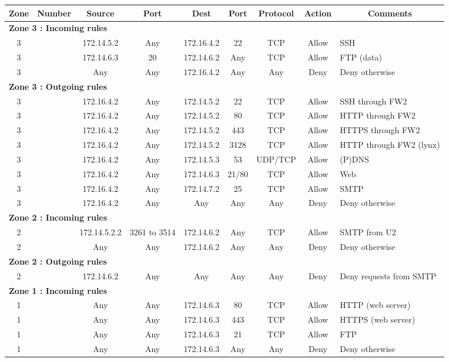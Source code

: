 \documentclass[a4paper,titlepage]{article}
\begin{document}
\begin{table}[h]
	\centering
	\small
	\begin{tabular}{c|c|cc|cc|ccl}
		Zone & Number & Source & Port & Dest & Port & Protocol & Action & \multicolumn{1}{c}{Comments}\\
		\hline
		\multicolumn{9}{l}{\textbf{Zone 3 : Incoming rules}}\\
		3 &  & 172.14.5.2 & Any & 172.16.4.2 & 22 & TCP & Allow & SSH\\
		3 &  & 172.14.6.3 & 20 & 172.14.6.2 & Any & TCP & Allow & FTP (data)\\
		3 &  & Any & Any & 172.16.4.2 & Any & Any & Deny & Deny otherwise\\

		\hline
		\multicolumn{9}{l}{\textbf{Zone 3 : Outgoing rules}}\\
		3 &  & 172.16.4.2 & Any & 172.14.5.2 & 22 & TCP & Allow & SSH through FW2\\
		3 &  & 172.16.4.2 & Any & 172.14.5.2 & 80 & TCP & Allow & HTTP through FW2\\
		3 &  & 172.16.4.2 & Any & 172.14.5.2 & 443 & TCP & Allow & HTTPS through FW2\\
		3 &  & 172.16.4.2 & Any & 172.14.5.2 & 3128 & TCP & Allow & HTTP through FW2 (lynx) \\
		3 &  & 172.16.4.2 & Any & 172.14.5.3 & 53 & UDP/TCP & Allow & (P)DNS\\
		3 &  & 172.16.4.2 & Any & 172.14.6.3 & 21/80 & TCP & Allow & Web\\
		3 &  & 172.16.4.2 & Any & 172.14.7.2 & 25 & TCP & Allow & SMTP\\
		3 &  & 172.16.4.2 & Any & Any & Any & Any & Deny & Deny otherwise\\

		\hline
		\multicolumn{9}{l}{\textbf{Zone 2 : Incoming rules}}\\
		2 &  & 172.14.5.2.2 & 3261 to 3514 & 172.14.6.2 & Any & TCP & Allow & SMTP from U2\\
		2 &  & Any & Any & 172.14.6.2 & Any & Any & Deny & Deny otherwise\\

		\hline
		\multicolumn{9}{l}{\textbf{Zone 2 : Outgoing rules}}\\
		2 &  & 172.14.6.2 & Any & Any & Any & Any & Deny & Deny requests from SMTP\\

		\hline
		\multicolumn{9}{l}{\textbf{Zone 1 : Incoming rules}}\\
		1 &  & Any & Any & 172.14.6.3 & 80 & TCP & Allow & HTTP (web server)\\
		1 &  & Any & Any & 172.14.6.3 & 443 & TCP & Allow & HTTPS (web server)\\
		1 &  & Any & Any & 172.14.6.3 & 21 & TCP & Allow & FTP\\
		1 &  & Any & Any & 172.14.6.3 & Any & Any & Deny & Deny otherwise\\


\end{tabular}
\end{table}
\end{document}
